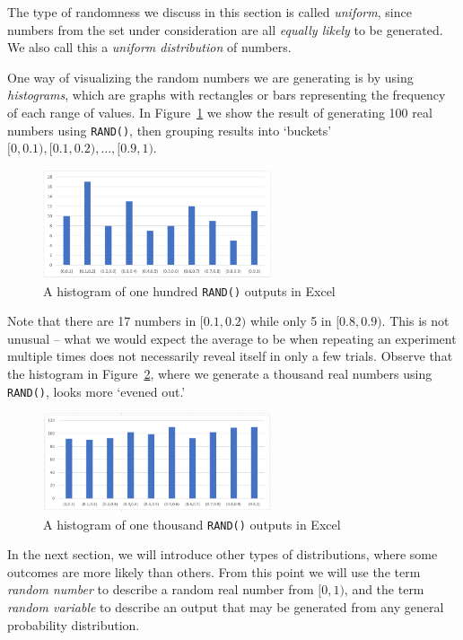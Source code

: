 The type of randomness we discuss in this section is called \emph{uniform}, since numbers from the set under consideration are all \emph{equally likely} to be generated.
We also call this a \emph{uniform distribution} of numbers.

One way of visualizing the random numbers we are generating is by using \emph{histograms}, which are graphs with rectangles or bars representing the frequency of each range of values.
In Figure~\ref{fig:histogram} we show the result of generating 100 real numbers using \texttt{RAND()}, then grouping results into `buckets' $[0,0.1), [0.1,0.2), \ldots, [0.9,1)$. 

\begin{figure}[htbp]
	\centering
	\includegraphics[width=0.6\textwidth]{fig/1_histogram.png}
	\caption{A histogram of one hundred \texttt{RAND()} outputs in Excel \label{fig:histogram}}
\end{figure}

Note that there are 17 numbers in $[0.1,0.2)$ while only 5 in $[0.8,0.9)$.
This is not unusual -- what we would expect the average to be when repeating an experiment multiple times does not necessarily reveal itself in only a few trials.
Observe that the histogram in Figure~\ref{fig:histogram1000}, where we generate a thousand real numbers using \texttt{RAND()}, looks more `evened out.'

\begin{figure}[htbp]
	\centering
	\includegraphics[width=0.6\textwidth]{fig/1_histogram_1000.png}
	\caption{A histogram of one thousand \texttt{RAND()} outputs in Excel \label{fig:histogram1000}}
\end{figure}


In the next section, we will introduce other types of distributions, where some outcomes are more likely than others.
From this point we will use the term \emph{random number} to describe a random real number from $[0,1)$, and the term \emph{random variable} to describe an output that may be generated from any
general probability distribution. 


